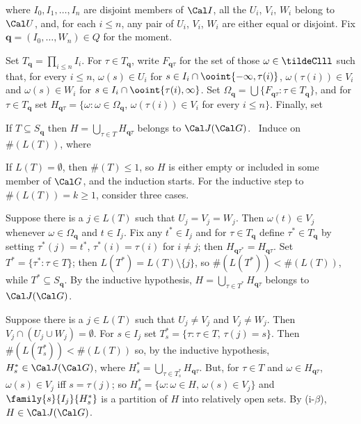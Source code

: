 {

\noindent where $I_0,I_1,\ldots,I_n$ are disjoint members of $\Cal I$,
all the $U_i$, $V_i$, $W_i$ belong to $\Cal U$, and, for each $i\le n$,
any pair of $U_i$, $V_i$, $W_i$ are either equal or disjoint.   Fix
$\pmb{q}=(I_0,\ldots,W_n)\in Q$ for the moment.

\medskip

 Set $T_{\pmb{q}}=\prod_{i\le n}I_i$.   For
$\tau\in T_{\pmb{q}}$, write $F_{\pmb{q}\tau}$ for the set of those
$\omega\in\tildeClll$ such that, for every $i\le n$,
$\omega(s)\in U_i$ for $s\in I_i\cap\ooint{-\infty,\tau(i)}$,
$\omega(\tau(i))\in V_i$ and $\omega(s)\in W_i$ for
$s\in I_i\cap\ooint{\tau(i),\infty}$.   Set
$\Omega_{\pmb{q}}=\bigcup\{F_{\pmb{q}\tau}:\tau\in T_{\pmb{q}}\}$,
and for $\tau\in T_{\pmb{q}}$ set
$H_{\pmb{q}\tau}
=\{\omega:\omega\in \Omega_{\pmb{q}},\,\omega(\tau(i))\in V_i$
for every $i\le n\}$.
Finally, set


\medskip

 If $T\subseteq S_{\pmb{q}}$ then
$H=\bigcup_{\tau\in T}H_{\pmb{q}\tau}$ belongs to $\Cal J(\Cal G)$.
\Prf\ Induce on $\#(L(T))$, where


\noindent If $L(T)=\emptyset$, then $\#(T)\le 1$, so $H$ is either empty
or included in some member of $\Cal G$, and the induction
starts.   For the inductive step to $\#(L(T))=k\ge 1$, consider three
cases.

\medskip

 Suppose there is a $j\in L(T)$ such that
$U_j=V_j=W_j$.   Then $\omega(t)\in V_j$ whenever
$\omega\in\Omega_{\pmb{q}}$ and
$t\in I_j$.   Fix any $t^*\in I_j$ and for $\tau\in T_{\pmb{q}}$ define
$\tau^*\in T_{\pmb{q}}$ by setting $\tau^*(j)=t^*$, $\tau^*(i)=\tau(i)$
for $i\ne j$;  then $H_{\pmb{q}\tau^*}=H_{\pmb{q}\tau}$.   Set
$T^*=\{\tau^*:\tau\in T\}$;  then $L(T^*)=L(T)\setminus\{j\}$, so
$\#(L(T^*))<\#(L(T))$, while $T^*\subseteq S_{\pmb{q}}$.   By the
inductive hypothesis, $H=\bigcup_{\tau\in T^*}H_{\pmb{q}\tau}$ belongs to
$\Cal J(\Cal G)$.

\medskip

 Suppose there is a $j\in L(T)$ such that $U_j\ne V_j$
and $V_j\ne W_j$.   Then $V_j\cap(U_j\cup W_j)=\emptyset$.   For
$s\in I_j$ set $T^*_s=\{\tau:\tau\in T,\,\tau(j)=s\}$.   Then
$\#(L(T^*_s))<\#(L(T))$ so, by the inductive hypothesis,
$H^*_s\in\Cal J(\Cal G)$,
where $H^*_s=\bigcup_{\tau\in T^*_s}H_{\pmb{q}\tau}$.   But, for
$\tau\in T$ and $\omega\in H_{\pmb{q}\tau}$, $\omega(s)\in V_j$ iff
$s=\tau(j)$;
so $H^*_s=\{\omega:\omega\in H,\,\omega(s)\in V_j\}$ and
$\family{s}{I_j}{H^*_s}$ is a
partition of $H$ into relatively open sets.   By (i-$\beta$),
$H\in\Cal J(\Cal G)$.

}
